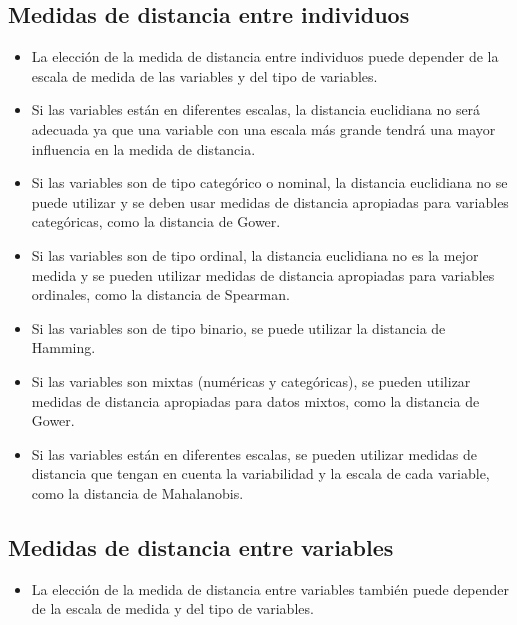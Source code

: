 \documentclass[
]{article}
\providecommand{\tightlist}{%
  \setlength{\itemsep}{0pt}\setlength{\parskip}{0pt}}
\begin{document}
\hypertarget{medidas-de-distancia-entre-individuos}{%
\subsection{Medidas de distancia entre
individuos}\label{medidas-de-distancia-entre-individuos}}

\begin{itemize}
\item
  La elección de la medida de distancia entre individuos puede depender
  de la escala de medida de las variables y del tipo de variables.
\item
  Si las variables están en diferentes escalas, la distancia euclidiana
  no será adecuada ya que una variable con una escala más grande tendrá
  una mayor influencia en la medida de distancia.
\item
  Si las variables son de tipo categórico o nominal, la distancia
  euclidiana no se puede utilizar y se deben usar medidas de distancia
  apropiadas para variables categóricas, como la distancia de Gower.
\item
  Si las variables son de tipo ordinal, la distancia euclidiana no es la
  mejor medida y se pueden utilizar medidas de distancia apropiadas para
  variables ordinales, como la distancia de Spearman.
\item
  Si las variables son de tipo binario, se puede utilizar la distancia
  de Hamming.
\item
  Si las variables son mixtas (numéricas y categóricas), se pueden
  utilizar medidas de distancia apropiadas para datos mixtos, como la
  distancia de Gower.
\item
  Si las variables están en diferentes escalas, se pueden utilizar
  medidas de distancia que tengan en cuenta la variabilidad y la escala
  de cada variable, como la distancia de Mahalanobis.
\end{itemize}

\hypertarget{medidas-de-distancia-entre-variables}{%
\subsection{Medidas de distancia entre
variables}\label{medidas-de-distancia-entre-variables}}

\begin{itemize}
\tightlist
\item
  La elección de la medida de distancia entre variables también puede
  depender de la escala de medida y del tipo de variables.
\end{itemize}
\end{document}

